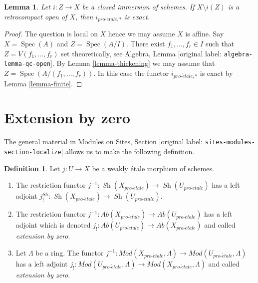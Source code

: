 \documentclass[10pt,a4paper]{article}
\theoremstyle{plain}
\newtheorem{lemma}[subsection]{Lemma}
\theoremstyle{definition}
\newtheorem{definition}[subsection]{Definition}
\theoremstyle{remark}
\numberwithin{equation}{subsection}
\def\Spec{\mathop{\mathrm{Spec}}}
\def\Sh{\mathop{\mathit{Sh}}\nolimits}
\def\proetale{{pro\text{-}\acute{e}tale}}
\begin{document}
\begin{lemma}
\label{lemma-closed-immersion-complement-retrocompact-exact}
Let $i : Z \to X$ be a closed immersion of schemes.
If $X \setminus i(Z)$ is a retrocompact open of $X$, then
$i_{\proetale, *}$ is exact.
\end{lemma}

\begin{proof}
The question is local on $X$ hence we may assume $X$ is affine.
Say $X = \Spec(A)$ and $Z = \Spec(A/I)$. There exist
$f_1, \ldots, f_r \in I$ such that $Z = V(f_1, \ldots, f_r)$
set theoretically, see Algebra, Lemma [original label: \nolinkurl{algebra-lemma-qc-open}].
By Lemma \ref{lemma-thickening} we may assume that
$Z = \Spec(A/(f_1, \ldots, f_r))$. In this case
the functor $i_{\proetale, *}$ is exact by
Lemma \ref{lemma-finite}.
\end{proof}





\section{Extension by zero}
\label{section-extension-by-zero}

\noindent
The general material in
Modules on Sites, Section [original label: \nolinkurl{sites-modules-section-localize}]
allows us to make the following definition.

\begin{definition}
\label{definition-extension-zero}
Let $j : U \to X$ be a weakly \'etale morphism of schemes.
\begin{enumerate}
\item The restriction functor
$j^{-1} : \Sh(X_\proetale) \to \Sh(U_\proetale)$
has a left adjoint
$j_!^{Sh} : \Sh(X_\proetale) \to \Sh(U_\proetale)$.
\item The restriction functor
$j^{-1} : \textit{Ab}(X_\proetale) \to \textit{Ab}(U_\proetale)$
has a left adjoint which is denoted
$j_! : \textit{Ab}(U_\proetale) \to \textit{Ab}(X_\proetale)$
and called {\it extension by zero}.
\item Let $\Lambda$ be a ring. The functor
$j^{-1} : \textit{Mod}(X_\proetale, \Lambda) \to
\textit{Mod}(U_\proetale, \Lambda)$
has a left adjoint
$j_! : \textit{Mod}(U_\proetale, \Lambda) \to
\textit{Mod}(X_\proetale, \Lambda)$
and called {\it extension by zero}.
\end{enumerate}
\end{definition}
\end{document}
